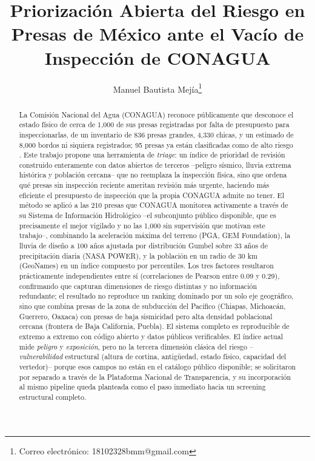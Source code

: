 \documentclass[journal]{IEEEtran}
\title{Priorizaci\'on Abierta del Riesgo en Presas de M\'exico ante el Vac\'io de Inspecci\'on de CONAGUA}
\author{Manuel Bautista Mej\'ia\thanks{Correo electr\'onico: 18102328bmm@gmail.com}}
\begin{document}
\maketitle

\begin{abstract}
La Comisi\'on Nacional del Agua (CONAGUA) reconoce p\'ublicamente que desconoce el estado f\'isico de cerca de 1{,}000 de sus presas registradas por falta de presupuesto para inspeccionarlas, de un inventario de 836 presas grandes, 4{,}330 chicas, y un estimado de 8{,}000 bordos ni siquiera registrados; 95 presas ya est\'an clasificadas como de alto riesgo \cite{infobae2020presas, eluniversal2021presas}. Este trabajo propone una herramienta de \emph{triage}: un \'indice de prioridad de revisi\'on construido enteramente con datos abiertos de terceros --peligro s\'ismico, lluvia extrema hist\'orica y poblaci\'on cercana-- que no reemplaza la inspecci\'on f\'isica, sino que ordena qu\'e presas sin inspecci\'on reciente ameritan revisi\'on m\'as urgente, haciendo m\'as eficiente el presupuesto de inspecci\'on que la propia CONAGUA admite no tener. El m\'etodo se aplic\'o a las 210 presas que CONAGUA monitorea activamente a trav\'es de su Sistema de Informaci\'on Hidrol\'ogico --el subconjunto p\'ublico disponible, que es precisamente el mejor vigilado y no las 1{,}000 sin supervisi\'on que motivan este trabajo--, combinando la aceleraci\'on m\'axima del terreno (PGA, GEM Foundation), la lluvia de dise\~no a 100 a\~nos ajustada por distribuci\'on Gumbel sobre 33 a\~nos de precipitaci\'on diaria (NASA POWER), y la poblaci\'on en un radio de 30 km (GeoNames) en un \'indice compuesto por percentiles. Los tres factores resultaron pr\'acticamente independientes entre s\'i (correlaciones de Pearson entre 0.09 y 0.29), confirmando que capturan dimensiones de riesgo distintas y no informaci\'on redundante; el resultado no reproduce un ranking dominado por un solo eje geogr\'afico, sino que combina presas de la zona de subducci\'on del Pac\'ifico (Chiapas, Michoac\'an, Guerrero, Oaxaca) con presas de baja sismicidad pero alta densidad poblacional cercana (frontera de Baja California, Puebla). El sistema completo es reproducible de extremo a extremo con c\'odigo abierto y datos p\'ublicos verificables. El \'indice actual mide \emph{peligro} y \emph{exposici\'on}, pero no la tercera dimensi\'on cl\'asica del riesgo --\emph{vulnerabilidad} estructural (altura de cortina, antig\"uedad, estado f\'isico, capacidad del vertedor)-- porque esos campos no est\'an en el cat\'alogo p\'ublico disponible; se solicitaron por separado a trav\'es de la Plataforma Nacional de Transparencia, y su incorporaci\'on al mismo pipeline queda planteada como el paso inmediato hacia un screening estructural completo.
\end{abstract}
\end{document}
